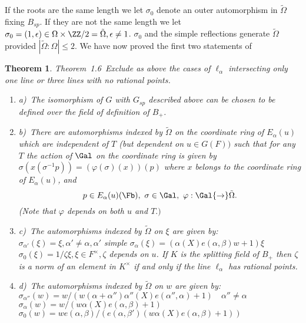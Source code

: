 \documentclass{memo-l}
\newtheorem{theorem}{Theorem}[section]
\theoremstyle{definition}
\theoremstyle{remark}
\numberwithin{section}{chapter}
\numberwithin{equation}{chapter}
\begin{document}
   If the roots are the same length we let ${\sigma}_{0}$ denote an outer
automorphism in $\tilde{\Omega}$ fixing $B_{sp}$.  If they are not the same
length we let ${\sigma}_{0}  =  (1,{\epsilon})  \in  {\Omega} \times 
{\ZZ}/2  =  \tilde{\Omega} , {\epsilon} \ne 1$.  ${\sigma}_{0}$ and the simple
reflections generate $\tilde{\Omega}$ provided $|\tilde\Omega:\Omega|\le2$. 
We have now proved the first two
statements of

\medpagebreak

\begin{theorem}{Theorem\ 1.6}\ Exclude as above the cases of
${\ell}_{{\alpha}}$ intersecting only one line or three lines with no
rational points.
 
\medpagebreak
\begin{enumerate}
\item{a)}\ The isomorphism of $G$ with $G_{sp}$ described above can be chosen to be
defined over the field of definition of $B_{+}$.
\medpagebreak
\item{b)}\ There are automorphisms indexed by $\tilde{\Omega}$ 
on the coordinate ring of
$E_{{\alpha}}(u)$ which are independent of $T$ (but dependent on $u  \in 
G(F))$ such that for any $T$ the action of $\Gal$ on the
coordinate ring is given by ${\sigma}(x({\sigma}^{-1}p))  = 
({\varphi}({\sigma})(x))(p)$ where $x$ belongs to the coordinate ring
of $E_{{\alpha}}(u)$, and $$p  \in  E_{{\alpha}}(u)(\Fb), \
{\sigma}  \in 
\Gal,\ {\varphi}: \Gal {\to} \tilde{\Omega} .$$ (Note that
${\varphi}$ depends on both $u$ and $T.)$
\medpagebreak
\item{c)}\ The automorphisms indexed by $\tilde{\Omega}$ on ${\xi}$ are given by:
 \newline
${\sigma}_{{\alpha}'}({\xi})  =  {\xi}, {\alpha}'  \ne {\alpha}, {\alpha}'$
simple						  
 \newline
${\sigma}_{{\alpha}}({\xi})  =  ({\alpha}(X)e({\alpha},{\beta})w+1){\xi}$
 \newline
${\sigma}_{0}({\xi})  =  1/{\zeta}{\xi}, {\xi}  \in  F^{\times}, {\zeta}$
depends on $u$.  If $K$ is the splitting field of $B_{+}$ then ${\zeta}$ is
a norm of an element in $K^{\times}$ if and only if the line ${\ell}_{{\alpha}}$
has rational points.
\medpagebreak
\item{d)}\ The automorphisms indexed by $\tilde{\Omega}$ on $w$ are given by:
 \newline
${\sigma}_{{\alpha}''}(w)  = 
w/(w({\alpha}+{\alpha}''){\alpha}''(X)e({\alpha}'',{\alpha})+1) \quad
{\alpha}''  \ne
{\alpha}$
 \newline
${\sigma}_{{\alpha}}(w)  =  w/(w{\alpha}(X)e({\alpha},{\beta})+1)$
 \newline
${\sigma}_{0}(w)  = 
we({\alpha},{\beta})/(e({\alpha},{\beta}')(w{\alpha}(X)e({\alpha},{\beta})+1))$
\end{enumerate}
\end{theorem}
\end{document}
